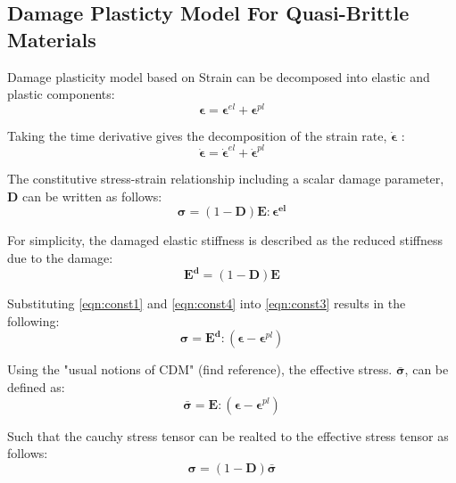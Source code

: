 \subsection{Damage Plasticty Model For Quasi-Brittle Materials}

Damage plasticity model based on 
Strain can be decomposed into elastic and plastic components:
\begin{equation}
\label{eqn:const1}
\boldsymbol{\epsilon} = \boldsymbol{\epsilon}^{el} + \boldsymbol{\epsilon}^{pl}
\end{equation}

Taking the time derivative gives the decomposition of the strain rate, $\boldsymbol{\dot{\epsilon}}$ :
\begin{equation}
\label{eqn:const2}
\boldsymbol{\dot{\epsilon}} = \boldsymbol{\dot{\epsilon}}^{el} + \boldsymbol{\dot{\epsilon}}^{pl}
\end{equation}

The constitutive stress-strain relationship including a scalar damage parameter, $\mathbf{D}$ can be written as follows:
\begin{equation}
\label{eqn:const3}
\boldsymbol{\sigma} = (1-\mathbf{D})\mathbf{E}:\boldsymbol{\epsilon^{el}}
\end{equation}

For simplicity, the damaged elastic stiffness is described as the reduced stiffness due to the damage:
\begin{equation}
\label{eqn:const4}
\mathbf{E^d} = (1-\mathbf{D})\mathbf{E}
\end{equation}

Substituting \ref{eqn:const1} and \ref{eqn:const4} into \ref{eqn:const3} results in the following:
\begin{equation}
\label{eqn:const5}
\boldsymbol{\sigma} = \mathbf{E^d}:(\boldsymbol{\epsilon}-\boldsymbol{\epsilon}^{pl})
\end{equation}

Using the "usual notions of CDM" (find reference), the effective stress. $\boldsymbol{\bar{\sigma}}$, can be defined as:
\begin{equation}
\label{eqn:const6}
\boldsymbol{\bar{\sigma}} = \mathbf{E}:(\boldsymbol{\epsilon}-\boldsymbol{\epsilon}^{pl})
\end{equation}

Such that the cauchy stress tensor can be realted to the effective stress tensor as follows:
\begin{equation}
\label{eqn:const7}
\boldsymbol{\sigma} = (1-\mathbf{D})\boldsymbol{\bar{\sigma}}
\end{equation}

